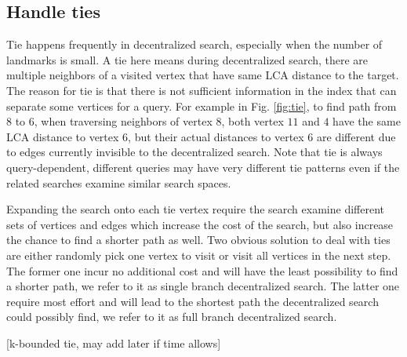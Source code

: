 \subsection{Handle ties}

Tie happens frequently in decentralized search, especially when the number of landmarks is small. A tie here means during decentralized search, there are multiple neighbors of a visited vertex that have same LCA distance to the target. The reason for tie is that there is not sufficient information in the index that can separate some vertices for a query. For example in Fig. \ref{fig:tie}, to find path from $8$ to $6$, when traversing neighbors of vertex $8$, both vertex $11$ and $4$ have the same LCA distance to vertex $6$, but their actual distances to vertex $6$ are different due to edges currently invisible to the decentralized search. Note that tie is always query-dependent, different queries may have very different tie patterns even if the related searches examine similar search spaces. 

Expanding the search onto each tie vertex require the search examine different sets of vertices and edges which increase the cost of the search, but also increase the chance to find a shorter path as well. Two obvious solution to deal with ties are either randomly pick one vertex to visit or visit all vertices in the next step. The former one incur no additional cost and will have the least possibility to find a shorter path, we refer to it as single branch decentralized search. The latter one require most effort and will lead to the shortest path the decentralized search could possibly find, we refer to it as full branch decentralized search.

[k-bounded tie, may add later if time allows]
